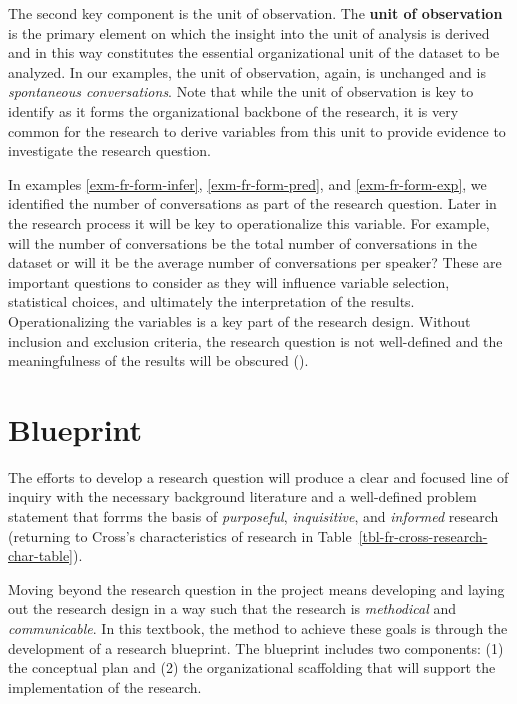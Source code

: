\documentclass[
  letterpaper,
]{latex/krantz}
\theoremstyle{definition}
\theoremstyle{remark}
\begin{document}
The second key component is the unit of observation. The \textbf{unit of
observation} is the primary element on which the insight into the unit
of analysis is derived and in this way constitutes the essential
organizational unit of the dataset to be analyzed. In our examples, the
unit of observation, again, is unchanged and is \emph{spontaneous
conversations}. Note that while the unit of observation is key to
identify as it forms the organizational backbone of the research, it is
very common for the research to derive variables from this unit to
provide evidence to investigate the research question.

In examples \ref{exm-fr-form-infer}, \ref{exm-fr-form-pred}, and
\ref{exm-fr-form-exp}, we identified the number of conversations as part
of the research question. Later in the research process it will be key
to operationalize this variable. For example, will the number of
conversations be the total number of conversations in the dataset or
will it be the average number of conversations per speaker? These are
important questions to consider as they will influence variable
selection, statistical choices, and ultimately the interpretation of the
results. Operationalizing the variables is a key part of the research
design. Without inclusion and exclusion criteria, the research question
is not well-defined and the meaningfulness of the results will be
obscured ().

\section{Blueprint}\label{sec-fr-blueprint}

The efforts to develop a research question will produce a clear and
focused line of inquiry with the necessary background literature and a
well-defined problem statement that forrms the basis of
\emph{purposeful}, \emph{inquisitive}, and \emph{informed} research
(returning to Cross's characteristics of research in
Table~\ref{tbl-fr-cross-research-char-table}).

Moving beyond the research question in the project means developing and
laying out the research design in a way such that the research is
\emph{methodical} and \emph{communicable}. In this textbook, the method
to achieve these goals is through the development of a research
blueprint. The blueprint includes two components: (1) the conceptual
plan and (2) the organizational scaffolding that will support the
implementation of the research.
\end{document}
